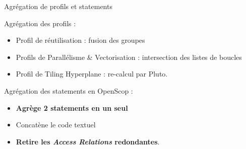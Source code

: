 \documentclass[5pt, compress]{beamer}
\begin{document}
    \begin{frame}{Agrégation de profils et statements}

        Agrégation des profils :
        \vspace{-1.1em}
        \begin{itemize}\itemsep0em
        \item Profil de réutilisation : fusion des groupes
        \item Profils de Parallélisme \& Vectorisation : intersection des listes de boucles
        \item Profil de Tiling Hyperplane : re-calcul par Pluto.
        \end{itemize}

        \bigskip
        
        Agrégation des statements en OpenScop :
        \vspace{-1.1em}
        \begin{itemize}\itemsep0em
            \item \textbf{Agrège 2 statements en un seul}
            \item Concatène le code textuel
            \item \textbf{Retire les \textit{Access Relations} redondantes}.
        \end{itemize}
    \end{frame}
\end{document}

